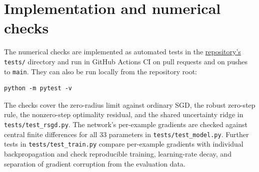 \section{Implementation and numerical checks}

The numerical checks are implemented as automated tests in the \href{https://github.com/Anya497/Optimization_HW1}{repository's}
\texttt{tests/} directory and run in GitHub Actions CI on pull requests and on
pushes to \texttt{main}. They can also be run locally from the repository root:
\begin{verbatim}
python -m pytest -v
\end{verbatim}

The checks cover the zero-radius limit against ordinary SGD, the robust
zero-step rule, the nonzero-step optimality residual, and the shared
uncertainty ridge in \texttt{tests/test\_rsgd.py}.
The network's per-example gradients are checked against central finite
differences for all 33 parameters in \texttt{tests/test\_model.py}.
Further tests in \texttt{tests/test\_train.py} compare per-example gradients
with individual backpropagation and check reproducible training, learning-rate
decay, and separation of gradient corruption from the evaluation data.
